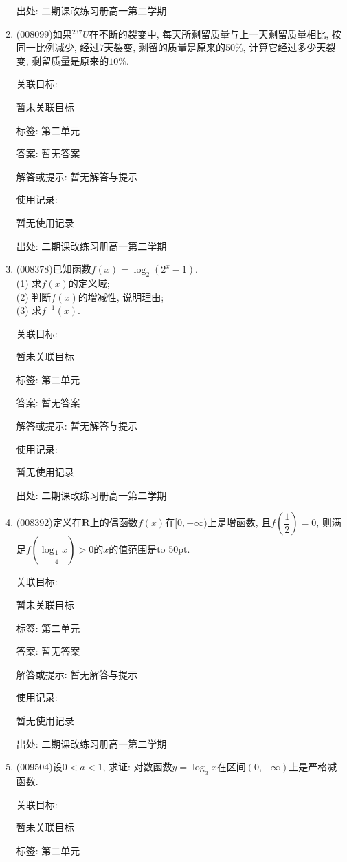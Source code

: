 \documentclass[10pt,a4paper]{article}
\newcommand{\blank}[1]{\underline{\hbox to #1pt{}}}
\begin{document}
\begin{enumerate}[1.]
出处: 二期课改练习册高一第二学期
\item { (008099)}如果$^{237}U$在不断的裂变中, 每天所剩留质量与上一天剩留质量相比, 按同一比例减少, 经过$7$天裂变, 剩留的质量是原来的$50\%$, 计算它经过多少天裂变, 剩留质量是原来的$10\%$.


关联目标:

暂未关联目标



标签: 第二单元

答案: 暂无答案

解答或提示: 暂无解答与提示

使用记录:

暂无使用记录


出处: 二期课改练习册高一第二学期
\item { (008378)}已知函数$f(x)=\log _2(2^x-1)$.\\
(1) 求$f(x)$的定义域;\\
(2) 判断$f(x)$的增减性, 说明理由;\\
(3) 求$f^{-1}(x)$.


关联目标:

暂未关联目标



标签: 第二单元

答案: 暂无答案

解答或提示: 暂无解答与提示

使用记录:

暂无使用记录


出处: 二期课改练习册高一第二学期
\item { (008392)}定义在$\mathbf{R}$上的偶函数$f(x)$在$[0,+\infty)$上是增函数, 且$f(\dfrac 12)=0$, 则满足$f(\log _{\dfrac 14}x)>0$的$x$的值范围是\blank{50}.


关联目标:

暂未关联目标



标签: 第二单元

答案: 暂无答案

解答或提示: 暂无解答与提示

使用记录:

暂无使用记录


出处: 二期课改练习册高一第二学期
\item { (009504)}设$0<a<1$, 求证: 对数函数$y=\log_ax$在区间$(0, +\infty)$上是严格减函数.


关联目标:

暂未关联目标



标签: 第二单元


\end{enumerate}
\end{document}
